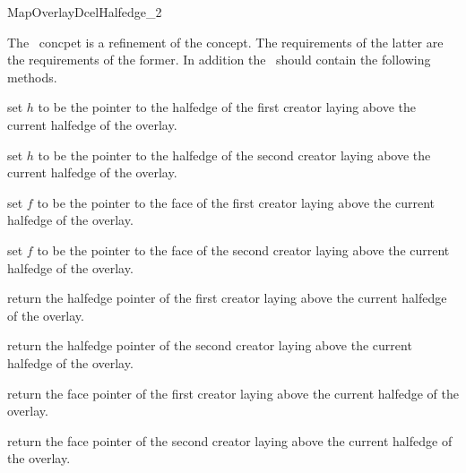 
\ccRefPageBegin


\begin{ccRefConcept}{MapOverlayDcelHalfedge_2}


The \ccRefName\ concpet is a refinement of the  concept. 
The requirements of the latter are the requirements of the former.
In addition the \ccRefName\ should contain the following methods.

  \ccOperations
  {set $h$ to be the pointer to the halfedge of the first creator laying above the current halfedge of the overlay.}

  {set $h$ to be the pointer to the halfedge of the second creator laying above the current halfedge of the overlay.}

  {set $f$ to be the pointer to the face of the first creator laying above the current halfedge of the overlay.}
  
  {set $f$ to be the pointer to the face of the second creator laying above the current halfedge of the overlay.}
   
  {return the halfedge pointer of the first creator laying above the current halfedge of the overlay.}

  {return the halfedge pointer of the second creator laying above the current halfedge of the overlay.}

  {return the face pointer of the first creator laying above the current halfedge of the overlay.}

  {return the face pointer of the second creator laying above the current halfedge of the overlay.}
  
\end{ccRefConcept} %

\ccRefPageEnd
